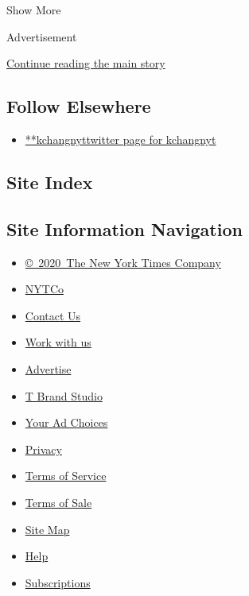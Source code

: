 Show More

Advertisement

\protect\hyperlink{after-mid2}{Continue reading the main story}

\hypertarget{follow-elsewhere}{%
\subsection{Follow Elsewhere}\label{follow-elsewhere}}

\begin{itemize}
\tightlist
\item
  \href{https://twitter.com/kchangnyt}{**kchangnyttwitter page for
  kchangnyt}
\end{itemize}

\hypertarget{site-index}{%
\subsection{Site Index}\label{site-index}}

\hypertarget{site-information-navigation}{%
\subsection{Site Information
Navigation}\label{site-information-navigation}}

\begin{itemize}
\tightlist
\item
  \href{https://help.nytimes3xbfgragh.onion/hc/en-us/articles/115014792127-Copyright-notice}{©~2020~The
  New York Times Company}
\end{itemize}

\begin{itemize}
\tightlist
\item
  \href{https://www.nytco.com/}{NYTCo}
\item
  \href{https://help.nytimes3xbfgragh.onion/hc/en-us/articles/115015385887-Contact-Us}{Contact
  Us}
\item
  \href{https://www.nytco.com/careers/}{Work with us}
\item
  \href{https://nytmediakit.com/}{Advertise}
\item
  \href{http://www.tbrandstudio.com/}{T Brand Studio}
\item
  \href{https://www.nytimes3xbfgragh.onion/privacy/cookie-policy\#how-do-i-manage-trackers}{Your
  Ad Choices}
\item
  \href{https://www.nytimes3xbfgragh.onion/privacy}{Privacy}
\item
  \href{https://help.nytimes3xbfgragh.onion/hc/en-us/articles/115014893428-Terms-of-service}{Terms
  of Service}
\item
  \href{https://help.nytimes3xbfgragh.onion/hc/en-us/articles/115014893968-Terms-of-sale}{Terms
  of Sale}
\item
  \href{https://spiderbites.nytimes3xbfgragh.onion}{Site Map}
\item
  \href{https://help.nytimes3xbfgragh.onion/hc/en-us}{Help}
\item
  \href{https://www.nytimes3xbfgragh.onion/subscription?campaignId=37WXW}{Subscriptions}
\end{itemize}
